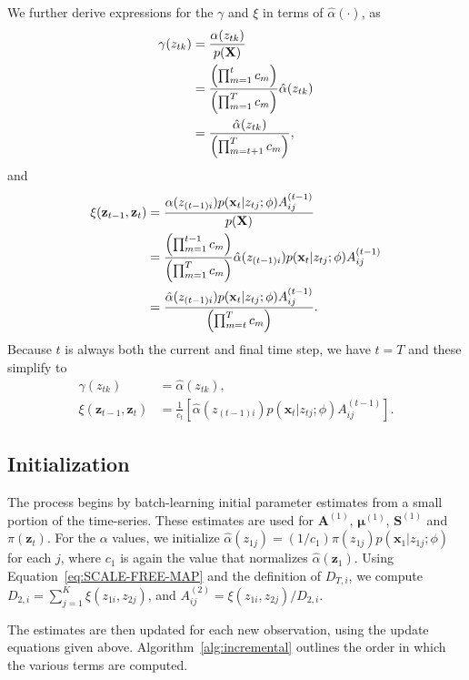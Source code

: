 \documentclass{article}
\begin{document}
We further derive expressions for the $\gamma$ and $\xi$ in terms of $\hat{\alpha}(\cdot)$, as
\begin{align}
    \gamma(z_{tk}) &= \frac{\alpha(z_{tk})}{p(\mathbf{X})} \notag{}\\
                   &= \frac{\left(\prod^{t}_{m=1} c_m\right)}{\left(\prod^{T}_{m=1} c_m\right)}\hat{\alpha}(z_{tk}) \notag{}\\
                   &= \frac{\hat{\alpha}(z_{tk})}{\left(\prod^{T}_{m=t+1} c_m\right)},
\end{align}
and
\begin{align}
    \xi(\mathbf{z}_{t-1}, \mathbf{z}_{t})
                   &= \frac{\alpha(z_{(t-1)i})p(\mathbf{x}_t| z_{tj}; \phi)A_{ij}^{(t-1)}}{p(\mathbf{X})} \notag{}\\
                   &= \frac{\left(\prod^{t-1}_{m=1} c_m\right)}{\left(\prod^{T}_{m=1} c_m\right)}\hat{\alpha}(z_{(t-1)i})p(\mathbf{x}_t| z_{tj}; \phi)A_{ij}^{(t-1)} \notag{}\\                   
                   &= \frac{\hat{\alpha}(z_{(t-1)i})p(\mathbf{x}_t| z_{tj}; \phi)A_{ij}^{(t-1)}}{\left(\prod^{T}_{m=t} c_m\right)}.
\end{align}
Because $t$ is always both the current and final time step, we have $t=T$ and these simplify to
\begin{align}
    \gamma(z_{tk}) &= \hat{\alpha}(z_{tk}), \\
    \xi(\mathbf{z}_{t-1}, \mathbf{z}_{t}) &= \frac{1}{c_t}\left[\hat{\alpha}(z_{(t-1)i})p(\mathbf{x}_t| z_{tj}; \phi)A_{ij}^{(t-1)}\right]. 
\end{align}

\subsection{Initialization}

The process begins by batch-learning initial parameter estimates from a small
portion of the time-series. These estimates are used for $\mathbf{A}^{(1)}$,
$\mathbf{\mu}^{(1)}$, $\mathbf{S}^{(1)}$ and $\pi(\mathbf{z}_t)$. For the
$\alpha$ values, we initialize $\hat{\alpha}(z_{1j}) = (1/c_1)\pi(z_{1j})p(\mathbf{x}_1| z_{1j}; \phi)$
for each $j$, where $c_1$ is again the value that normalizes $\hat{\alpha}(\mathbf{z}_{1})$. 
Using Equation~\ref{eq:SCALE-FREE-MAP} and the definition of $D_{T,i}$, we compute 
$D_{2,i} = \sum_{j=1}^{K} \xi(z_{1i}, z_{2j})$, and $A_{ij}^{(2)} = \xi(z_{1i}, z_{2j})/D_{2,i}$. 

The estimates are then updated for each new observation, using the update equations given above. Algorithm~\ref{alg:incremental} outlines the order in which the various terms are computed.
\end{document}
